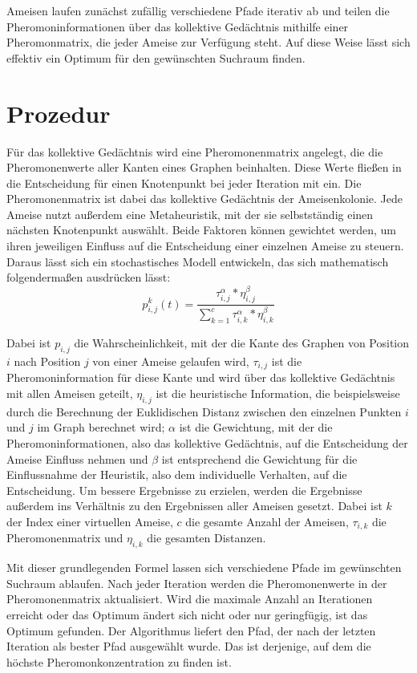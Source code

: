 Ameisen laufen zunächst zufällig verschiedene Pfade iterativ ab und 
teilen die Pheromoninformationen über das kollektive Gedächtnis mithilfe einer 
Pheromonmatrix, die jeder Ameise zur Verfügung steht. Auf diese Weise lässt 
sich effektiv ein Optimum für den gewünschten Suchraum finden.

\section{Prozedur}
\label{sec:prozedur}

Für das kollektive Gedächtnis wird eine Pheromonenmatrix angelegt, die die
Pheromonenwerte aller Kanten eines Graphen beinhalten. Diese Werte fließen
in die Entscheidung für einen Knotenpunkt bei jeder Iteration mit ein. Die
Pheromonenmatrix ist dabei das kollektive Gedächtnis der Ameisenkolonie.
Jede Ameise nutzt außerdem eine Metaheuristik, mit der sie selbstständig einen
nächsten Knotenpunkt auswählt. Beide Faktoren können gewichtet werden, um
ihren jeweiligen Einfluss auf die Entscheidung einer einzelnen Ameise zu
steuern.
Daraus lässt sich ein stochastisches Modell entwickeln, das sich mathematisch
folgendermaßen ausdrücken lässt:
\begin{equation}
    p_{i,j}^k(t) = \frac{\tau_{i,j}^\alpha * \eta_{i,j}^\beta}{
        \sum_{k=1}^c \tau_{i,k}^\alpha * \eta_{i,k}^\beta
    }
\end{equation}

Dabei ist $p_{i,j}$ die Wahrscheinlichkeit, mit der die Kante des Graphen
von Position $i$ nach Position $j$ von einer Ameise gelaufen wird,
$\tau_{i,j}$ ist die Pheromoninformation für diese Kante und wird über das
kollektive Gedächtnis mit allen Ameisen geteilt, $\eta_{i,j}$ ist die
heuristische Information, die beispielsweise durch die Berechnung der
Euklidischen Distanz zwischen den einzelnen Punkten $i$ und 
$j$ im Graph berechnet wird;
$\alpha$ ist die Gewichtung, mit der die Pheromoninformationen, also das
kollektive Gedächtnis, auf die Entscheidung der Ameise Einfluss nehmen und
$\beta$ ist entsprechend die Gewichtung für die Einflussnahme der Heuristik,
also dem individuelle Verhalten, auf die Entscheidung.
Um bessere Ergebnisse zu erzielen, werden die Ergebnisse außerdem ins
Verhältnis zu den Ergebnissen aller Ameisen gesetzt.
Dabei ist $k$ der Index einer virtuellen Ameise, $c$ die 
gesamte Anzahl der Ameisen, $\tau_{i,k}$ die Pheromonenmatrix
und $\eta_{i,k}$ die gesamten Distanzen.

Mit dieser grundlegenden Formel lassen sich verschiedene Pfade im
gewünschten Suchraum ablaufen.
Nach jeder Iteration werden die Pheromonenwerte in der Pheromonenmatrix
aktualisiert. Wird die maximale Anzahl an Iterationen erreicht oder das
Optimum ändert sich nicht oder nur geringfügig, ist das Optimum gefunden.
Der Algorithmus liefert den Pfad, der nach der letzten Iteration als
bester Pfad ausgewählt wurde. Das ist derjenige, auf dem die höchste
Pheromonkonzentration zu finden ist.

